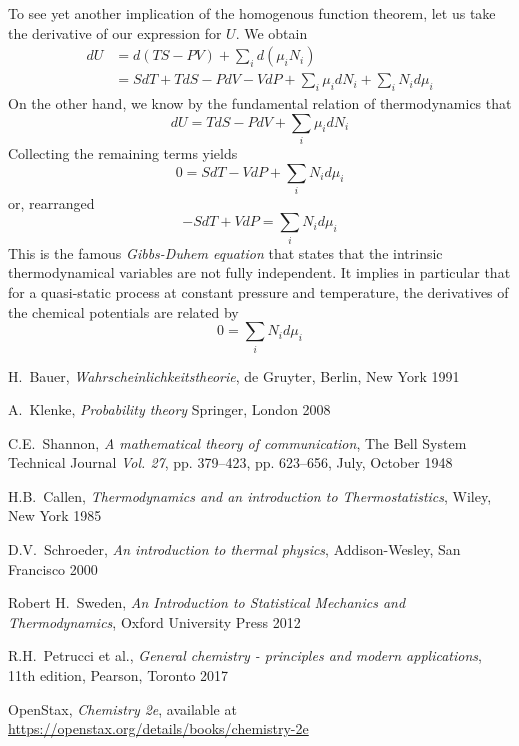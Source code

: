 \documentclass[a4paper, draft]{report}
\numberwithin{section}{chapter}
\numberwithin{equation}{chapter}
\theoremstyle{own}
\theoremstyle{remark}
\begin{document}
To see yet another implication of the homogenous function theorem, let us take the derivative of our expression for $U$. We obtain
\begin{align*}
dU &= d(TS - PV) + \sum_i d(\mu_i N_i) \\
&= S dT + T dS - P dV - V dP + \sum_i \mu_i dN_i + \sum_i N_i d\mu_i 
\end{align*}
On the other hand, we know by the fundamental relation of thermodynamics that
$$
dU = T dS - P dV  + \sum_i \mu_i dN_i 
$$
Collecting the remaining terms yields
$$
0 = S dT  - V dP + \sum_i N_i d\mu_i 
$$
or, rearranged
$$
- S dT  + V dP = \sum_i N_i d\mu_i 
$$
This is the famous {\em Gibbs-Duhem equation} that states that the intrinsic thermodynamical variables are not fully independent. It implies in particular that for a quasi-static process at constant pressure and temperature, the derivatives of the chemical potentials are related by
$$
0 = \sum_i N_i d\mu_i 
$$



\begin{thebibliography}{9}
	
H.~Bauer,
{\em Wahrscheinlichkeitstheorie},
de Gruyter, Berlin, New York 1991
	
A.~Klenke,
{\em Probability theory}
Springer, London 2008


C.E.~Shannon,
{\em A mathematical theory of communication}, 
The Bell System Technical Journal {\em Vol. 27}, pp. 379--423, pp. 623--656, July, October 1948



H.B.~Callen,
{\em Thermodynamics and an introduction to Thermostatistics},
Wiley, New York 1985


D.V.~Schroeder,
{\em An introduction to thermal physics},
Addison-Wesley, San Francisco 2000

Robert H.~Sweden,
{\em An Introduction to Statistical Mechanics and Thermodynamics}, Oxford University Press 2012

R.H.~Petrucci et al., 
{\em General chemistry - principles and modern applications}, 11th edition, Pearson, Toronto 2017

OpenStax, {\em Chemistry 2e}, available at \url{https://openstax.org/details/books/chemistry-2e}


\end{thebibliography}
\end{document}

